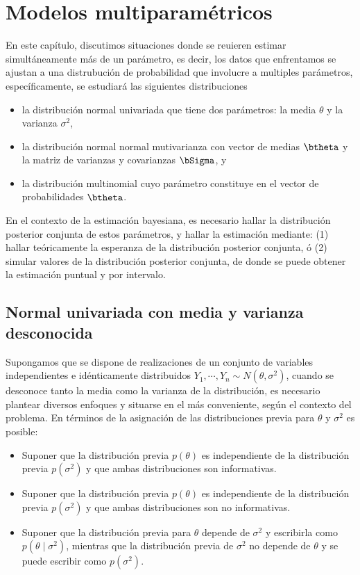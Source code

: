 
 
\chapter{Modelos multiparamétricos}
En este capítulo, discutimos situaciones donde se reuieren estimar simultáneamente más de un parámetro, es decir, los datos que enfrentamos se ajustan a una distrubución de probabilidad que involucre a multiples parámetros, específicamente, se estudiará las siguientes distribuciones
\begin{itemize}
\item la distribución normal univariada que tiene dos parámetros: la media $\theta$ y la varianza $\sigma^2$,
\item la distribución normal normal mutivarianza con vector de medias $\btheta$ y la matriz de varianzas y covarianzas $\bSigma$, y
\item la distribución multinomial cuyo parámetro constituye en el vector de probabilidades $\btheta$.
\end{itemize}

En el contexto de la estimación bayesiana, es necesario hallar la distribución posterior conjunta de estos parámetros, y hallar la estimación mediante: (1) hallar teóricamente la esperanza de la distribución posterior conjunta, ó (2) simular valores de la distribución posterior conjunta, de donde se puede obtener la estimación puntual y por intervalo.

\section{Normal univariada con media y varianza desconocida}

Supongamos que se dispone de realizaciones de un conjunto de variables independientes e idénticamente distribuidos $Y_1,\cdots,Y_n\sim N(\theta,\sigma^2)$, cuando se desconoce tanto la media como la varianza de la distribución, es necesario plantear diversos enfoques y situarse en el más conveniente, según el contexto del problema. En términos de la asignación de las distribuciones previa para $\theta$ y $\sigma^2$ es posible:

\begin{itemize}
\item Suponer que la distribución previa $p(\theta)$ es independiente de la distribución previa $p(\sigma^2)$ y que ambas distribuciones son informativas. 
\item Suponer que la distribución previa $p(\theta)$ es independiente de la distribución previa $p(\sigma^2)$ y que ambas distribuciones son no informativas.
\item Suponer que la distribución previa para $\theta$ depende de $\sigma^2$ y escribirla como $p(\theta \mid \sigma^2)$, mientras que la distribución previa de $\sigma^2$ no depende de $\theta$ y se puede escribir como $p(\sigma^2)$.
\end{itemize}

